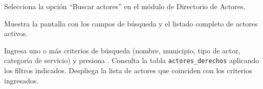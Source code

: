 \begin{UCtrayectoria}
	\UCpaso[\UCactor] Selecciona la opción ``Buscar actores'' en el módulo de Directorio de Actores.
	
	\UCpaso Muestra la pantalla  con los campos de búsqueda y el listado completo de actores activos.
	
	
	\UCpaso[\UCactor] \label{CU-46.ingresaCriterios} Ingresa uno o más criterios de búsqueda (nombre, municipio, tipo de actor, categoría de servicio) y presiona .
	\UCpaso Consulta la tabla \texttt{actores\_derechos} aplicando los filtros indicados. 
	\UCpaso Despliega la lista de actores que coinciden con los criterios ingresados.
\end{UCtrayectoria}

